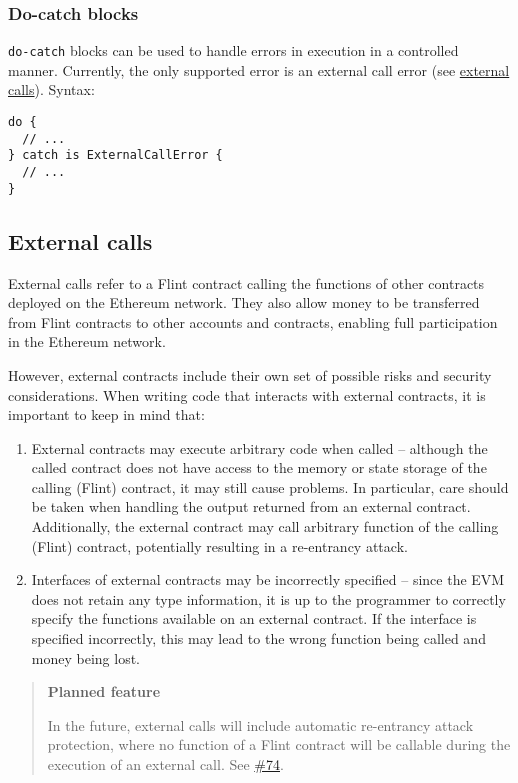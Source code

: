 \subsubsection{Do-catch blocks}
\label{sec:appendix-b-do-catch-blocks}

\texttt{do-catch} blocks can be used to handle errors in execution in a controlled manner. Currently, the only supported error is an external call error (see \hyperref[sec:appendix-b-external-calls]{external calls}). Syntax:

\begin{verbatim}
do {
  // ...
} catch is ExternalCallError {
  // ...
}
\end{verbatim}

\subsection{External calls}
\label{sec:appendix-b-external-calls}

External calls refer to a Flint contract calling the functions of other contracts deployed on the Ethereum network. They also allow money to be transferred from Flint contracts to other accounts and contracts, enabling full participation in the Ethereum network.

However, external contracts include their own set of possible risks and security considerations. When writing code that interacts with external contracts, it is important to keep in mind that:

\begin{enumerate}
	\item External contracts may execute arbitrary code when called – although the called contract does not have access to the memory or state storage of the calling (Flint) contract, it may still cause problems. In particular, care should be taken when handling the output returned from an external contract. Additionally, the external contract may call arbitrary function of the calling (Flint) contract, potentially resulting in a re-entrancy attack.
	\item Interfaces of external contracts may be incorrectly specified – since the EVM does not retain any type information, it is up to the programmer to correctly specify the functions available on an external contract. If the interface is specified incorrectly, this may lead to the wrong function being called and money being lost.
\end{enumerate}

\begin{quote}
\textbf{Planned feature}

In the future, external calls will include automatic re-entrancy attack protection, where no function of a Flint contract will be callable during the execution of an external call. See \href{https://github.com/flintrocks/flint/issues/74}{\#74}.
\end{quote}

